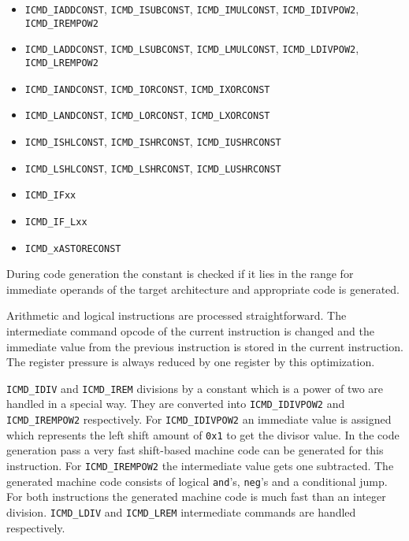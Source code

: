 \begin{itemize}
 \item \texttt{ICMD\_IADDCONST}, \texttt{ICMD\_ISUBCONST},
 \texttt{ICMD\_IMULCONST}, \texttt{ICMD\_IDIVPOW2},
 \texttt{ICMD\_IREMPOW2}

 \item \texttt{ICMD\_LADDCONST}, \texttt{ICMD\_LSUBCONST},
 \texttt{ICMD\_LMULCONST}, \texttt{ICMD\_LDIVPOW2},
 \texttt{ICMD\_LREMPOW2}

 \item \texttt{ICMD\_IANDCONST}, \texttt{ICMD\_IORCONST},
 \texttt{ICMD\_IXORCONST}

 \item \texttt{ICMD\_LANDCONST}, \texttt{ICMD\_LORCONST},
 \texttt{ICMD\_LXORCONST}

 \item \texttt{ICMD\_ISHLCONST}, \texttt{ICMD\_ISHRCONST},
 \texttt{ICMD\_IUSHRCONST}

 \item \texttt{ICMD\_LSHLCONST}, \texttt{ICMD\_LSHRCONST},
 \texttt{ICMD\_LUSHRCONST}

 \item \texttt{ICMD\_IFxx}

 \item \texttt{ICMD\_IF\_Lxx}

 \item \texttt{ICMD\_xASTORECONST}
\end{itemize}

During code generation the constant is checked if it lies in the range
for immediate operands of the target architecture and appropriate code
is generated.

Arithmetic and logical instructions are processed straightforward. The
intermediate command opcode of the current instruction is changed and
the immediate value from the previous instruction is stored in the
current instruction. The register pressure is always reduced by one
register by this optimization.

\texttt{ICMD\_IDIV} and \texttt{ICMD\_IREM} divisions by a constant
which is a power of two are handled in a special way. They are
converted into \texttt{ICMD\_IDIVPOW2} and \texttt{ICMD\_IREMPOW2}
respectively. For \texttt{ICMD\_IDIVPOW2} an immediate value is
assigned which represents the left shift amount of \texttt{0x1} to get
the divisor value. In the code generation pass a very fast shift-based
machine code can be generated for this instruction. For
\texttt{ICMD\_IREMPOW2} the intermediate value gets one
subtracted. The generated machine code consists of logical
\texttt{and}'s, \texttt{neg}'s and a conditional jump. For both
instructions the generated machine code is much fast than an integer
division. \texttt{ICMD\_LDIV} and \texttt{ICMD\_LREM} intermediate
commands are handled respectively.


